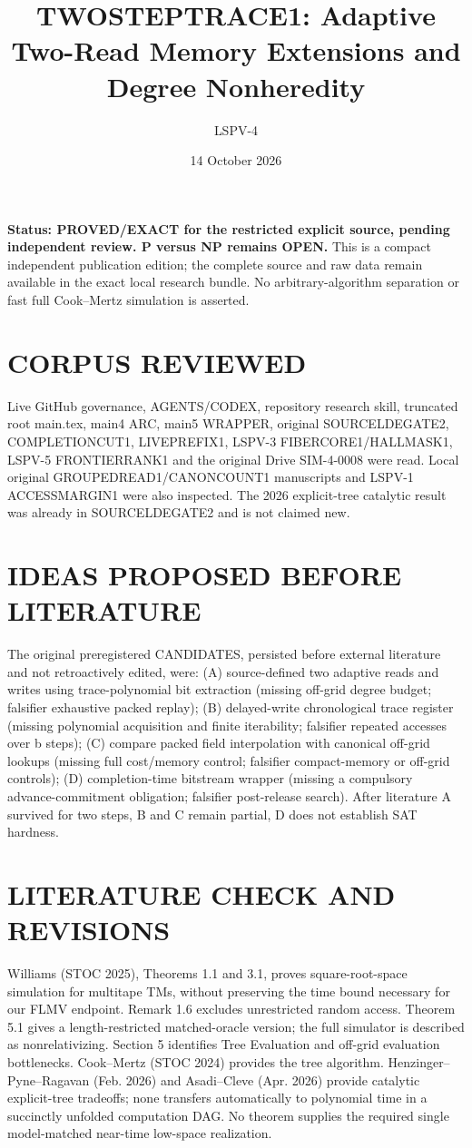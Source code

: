 \documentclass{article}
\title{TWOSTEPTRACE1: Adaptive Two-Read Memory Extensions and Degree Nonheredity}
\author{LSPV-4}
\date{14 October 2026}
\begin{document}
\maketitle
\noindent\textbf{Status: PROVED/EXACT for the restricted explicit source, pending independent review. P versus NP remains OPEN.} This is a compact independent publication edition; the complete source and raw data remain available in the exact local research bundle. No arbitrary-algorithm separation or fast full Cook--Mertz simulation is asserted.

\section{CORPUS REVIEWED}
Live GitHub governance, AGENTS/CODEX, repository research skill, truncated root main.tex, main4 ARC, main5 WRAPPER, original SOURCELDEGATE2, COMPLETIONCUT1, LIVEPREFIX1, LSPV-3 FIBERCORE1/HALLMASK1, LSPV-5 FRONTIERRANK1 and the original Drive SIM-4-0008 were read. Local original GROUPEDREAD1/CANONCOUNT1 manuscripts and LSPV-1 ACCESSMARGIN1 were also inspected. The 2026 explicit-tree catalytic result was already in SOURCELDEGATE2 and is not claimed new.

\section{IDEAS PROPOSED BEFORE LITERATURE}
The original preregistered CANDIDATES, persisted before external literature and not retroactively edited, were: (A) source-defined two adaptive reads and writes using trace-polynomial bit extraction (missing off-grid degree budget; falsifier exhaustive packed replay); (B) delayed-write chronological trace register (missing polynomial acquisition and finite iterability; falsifier repeated accesses over b steps); (C) compare packed field interpolation with canonical off-grid lookups (missing full cost/memory control; falsifier compact-memory or off-grid controls); (D) completion-time bitstream wrapper (missing a compulsory advance-commitment obligation; falsifier post-release search). After literature A survived for two steps, B and C remain partial, D does not establish SAT hardness.

\section{LITERATURE CHECK AND REVISIONS}
Williams (STOC 2025), Theorems 1.1 and 3.1, proves square-root-space simulation for multitape TMs, without preserving the time bound necessary for our FLMV endpoint. Remark 1.6 excludes unrestricted random access. Theorem 5.1 gives a length-restricted matched-oracle version; the full simulator is described as nonrelativizing. Section 5 identifies Tree Evaluation and off-grid evaluation bottlenecks. Cook--Mertz (STOC 2024) provides the tree algorithm. Henzinger--Pyne--Ragavan (Feb. 2026) and Asadi--Cleve (Apr. 2026) provide catalytic explicit-tree tradeoffs; none transfers automatically to polynomial time in a succinctly unfolded computation DAG. No theorem supplies the required single model-matched near-time low-space realization.
\end{document}

